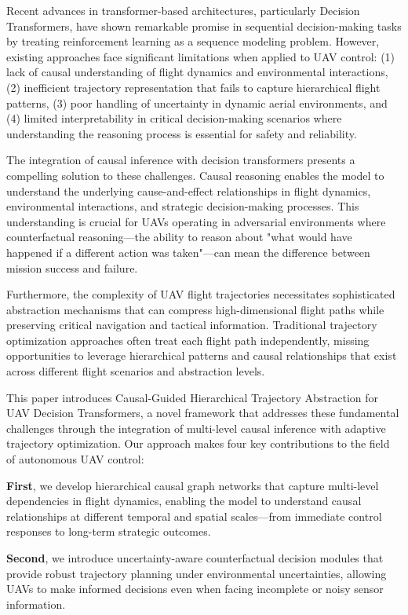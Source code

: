\documentclass[12pt]{article}
\begin{document}
Recent advances in transformer-based architectures, particularly Decision Transformers, have shown remarkable promise in sequential decision-making tasks by treating reinforcement learning as a sequence modeling problem. However, existing approaches face significant limitations when applied to UAV control: (1) lack of causal understanding of flight dynamics and environmental interactions, (2) inefficient trajectory representation that fails to capture hierarchical flight patterns, (3) poor handling of uncertainty in dynamic aerial environments, and (4) limited interpretability in critical decision-making scenarios where understanding the reasoning process is essential for safety and reliability.

The integration of causal inference with decision transformers presents a compelling solution to these challenges. Causal reasoning enables the model to understand the underlying cause-and-effect relationships in flight dynamics, environmental interactions, and strategic decision-making processes. This understanding is crucial for UAVs operating in adversarial environments where counterfactual reasoning—the ability to reason about "what would have happened if a different action was taken"—can mean the difference between mission success and failure.

Furthermore, the complexity of UAV flight trajectories necessitates sophisticated abstraction mechanisms that can compress high-dimensional flight paths while preserving critical navigation and tactical information. Traditional trajectory optimization approaches often treat each flight path independently, missing opportunities to leverage hierarchical patterns and causal relationships that exist across different flight scenarios and abstraction levels.

This paper introduces Causal-Guided Hierarchical Trajectory Abstraction for UAV Decision Transformers, a novel framework that addresses these fundamental challenges through the integration of multi-level causal inference with adaptive trajectory optimization. Our approach makes four key contributions to the field of autonomous UAV control:

\textbf{First}, we develop hierarchical causal graph networks that capture multi-level dependencies in flight dynamics, enabling the model to understand causal relationships at different temporal and spatial scales—from immediate control responses to long-term strategic outcomes.

\textbf{Second}, we introduce uncertainty-aware counterfactual decision modules that provide robust trajectory planning under environmental uncertainties, allowing UAVs to make informed decisions even when facing incomplete or noisy sensor information.
\end{document}
